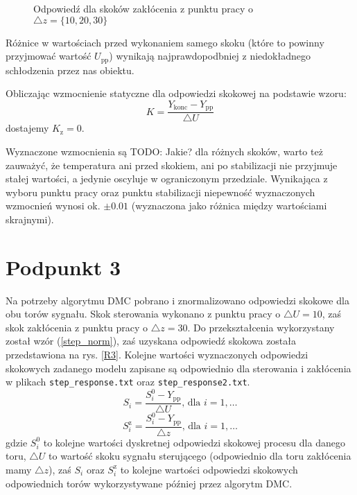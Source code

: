 \begin{figure}[ht]
\centering

\caption{Odpowiedź dla skoków zakłócenia z punktu pracy o $\triangle z = \{10, 20, 30\}$}
\label{R2}
\end{figure}

Różnice w wartościach przed wykonaniem samego skoku (które to powinny przyjmować wartość $U_{\mathrm{pp}}$) wynikają najprawdopodbniej z niedokładnego schłodzenia przez nas obiektu.

Obliczając wzmocnienie statyczne dla odpowiedzi skokowej na podstawie wzoru:
\begin{equation}
K=\frac{Y_{\mathrm{konc}}-Y_{\mathrm{pp}}}{\triangle U}
\end{equation}
dostajemy $K_{\mathrm{z}}=\num{0}$.

Wyznaczone wzmocnienia są TODO: Jakie? dla różnych skoków, warto też zauważyć, że temperatura ani przed skokiem, ani po stabilizacji nie przyjmuje stałej wartości, a jedynie oscyluje w ograniczonym przedziale. Wynikająca z wyboru punktu pracy oraz punktu stabilizacji niepewność wyznaczonych wzmocnień wynosi ok. $\pm \num{0,01}$ (wyznaczona jako różnica między wartościami skrajnymi).


\chapter{Podpunkt 3}
Na potrzeby algorytmu DMC pobrano i znormalizowano odpowiedzi skokowe dla obu torów sygnału. Skok sterowania wykonano z punktu pracy o $\triangle U = 10$, zaś skok zakłócenia z punktu pracy o $\triangle z = 30$. Do przekształcenia wykorzystany został wzór (\ref{step_norm}), zaś uzyskana odpowiedź skokowa została przedstawiona na rys. \ref{R3}. Kolejne wartości wyznaczonych odpowiedzi skokowych zadanego modelu zapisane są odpowiednio dla sterowania i zakłócenia w plikach \verb+step_response.txt+ oraz \verb+step_response2.txt+.
\begin{equation}
S_i = \frac{S_i^0 - Y_{\mathrm{pp}}}{\triangle U} \textrm{, dla } i=1,\ldots
\label{step_norm}
\end{equation}
\begin{equation}
S_i^{\mathrm{z}} = \frac{S_i^0 - Y_{\mathrm{pp}}}{\triangle z} \textrm{, dla } i=1,\ldots
\label{stepz_norm}
\end{equation}
gdzie $S_i^0$ to kolejne wartości dyskretnej odpowiedzi skokowej procesu dla danego toru, $\triangle U$ to wartość skoku sygnału sterującego (odpowiednio dla toru zakłócenia mamy $\triangle z$), zaś $S_i$ oraz $S_i^{\mathrm{z}}$ to kolejne wartości odpowiedzi skokowych odpowiednich torów wykorzystywane później przez algorytm DMC.

